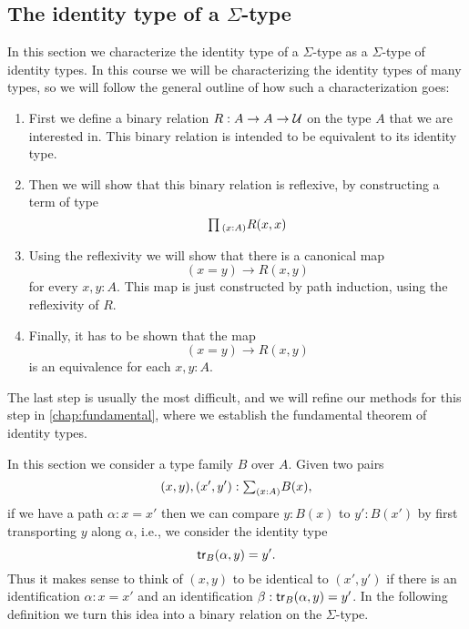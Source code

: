 \subsection{The identity type of a \texorpdfstring{$\Sigma$-}{dependent pair }type}

In this section we characterize the identity type of a $\Sigma$-type as a $\Sigma$-type of identity types. In this course we will be characterizing the identity types of many types, so we will follow the general outline of how such a characterization goes:
\begin{enumerate}
\item First we define a binary relation $R:A\to A\to \mathcal{U}$ on the type $A$ that we are interested in. This binary relation is intended to be equivalent to its identity type.
\item Then we will show that this binary relation is reflexive, by constructing a term of type
  \begin{equation*}
    \prd{x:A}R(x,x)
  \end{equation*}
\item Using the reflexivity we will show that there is a canonical map
  \begin{equation*}
    (x=y)\to R(x,y)
  \end{equation*}
  for every $x,y:A$. This map is just constructed by path induction, using the reflexivity of $R$.
\item Finally, it has to be shown that the map
  \begin{equation*}
    (x=y)\to R(x,y)
  \end{equation*}
  is an equivalence for each $x,y:A$. 
\end{enumerate}
The last step is usually the most difficult, and we will refine our methods for this step in \cref{chap:fundamental}, where we establish the fundamental theorem of identity types.

In this section we consider a type family $B$ over $A$. Given two pairs
\begin{equation*}
  (x,y),(x',y'):\sm{x:A}B(x),
\end{equation*}
if we have a path $\alpha:x=x'$ then we can compare $y:B(x)$ to $y':B(x')$ by first transporting $y$ along $\alpha$, i.e., we consider the identity type
\begin{equation*}
  \mathsf{tr}_B(\alpha,y)=y'.
\end{equation*}
Thus it makes sense to think of $(x,y)$ to be identical to $(x',y')$ if there is an identification $\alpha:x=x'$ and an identification $\beta:\mathsf{tr}_B(\alpha,y)=y'$. In the following definition we turn this idea into a binary relation on the $\Sigma$-type.


